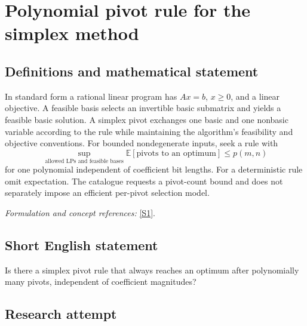 \documentclass[11pt,a4paper]{article}
\newcommand{\sref}[2]{\hyperlink{source:#1:#2}{[S#2]}}
\newif\ifshowcatalogue
\newcommand{\cataloguescope}[1]{\ifshowcatalogue
 \paragraph{Exact scope in the supplied catalogue.}
 \begin{quote}\small #1\end{quote}\fi}
\numberwithin{equation}{section}
\begin{document}
\setcounter{section}{130}
\clearpage
\section{\texorpdfstring{Polynomial pivot rule for the simplex method}{Polynomial pivot rule for the simplex method}}\label{131}
\subsection{Definitions and mathematical statement}
In standard form a rational linear program has $Ax=b$, $x\ge0$, and a linear objective. A feasible basis selects an invertible basic submatrix and yields a feasible basic solution. A simplex pivot exchanges one basic and one nonbasic variable according to the rule while maintaining the algorithm's feasibility and objective conventions. For bounded nondegenerate inputs, seek a rule with
\[
 \sup_{\text{allowed LPs and feasible bases}}\mathbb E[\text{pivots to an optimum}]
 \le p(m,n)
\]
for one polynomial independent of coefficient bit lengths. For a deterministic rule omit expectation. The catalogue requests a pivot-count bound and does not separately impose an efficient per-pivot selection model.
\par\smallskip\textit{Formulation and concept references:} \sref{131}{1}.
\cataloguescope{Construct a deterministic or randomized simplex pivot rule and a polynomial p such that, for every bounded nondegenerate rational linear program with m equality constraints and n variables and every feasible starting basis, the rule reaches an optimal basis in at most p(m,n) pivots, in expectation when the rule is randomized; or prove that no such rule exists.}
\subsection{Short English statement}
Is there a simplex pivot rule that always reaches an optimum after polynomially many pivots, independent of coefficient magnitudes?
\subsection{Research attempt}
\end{document}
